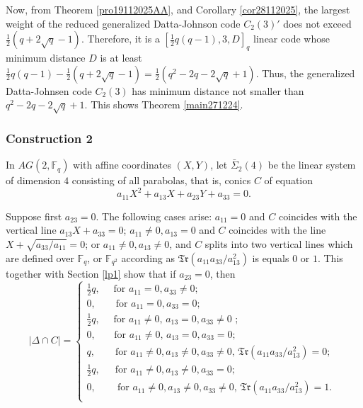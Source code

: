\documentclass[sn-mathphys-num]{sn-jnl}%
\begin{document}
Now, from Theorem \ref{pro19112025AA}, and Corollary  \ref{cor28112025}, the largest weight of the reduced generalized Datta-Johnson code $C_2(3)'$  does not exceed
$\frac{1}{2}(q+2\sqrt{q}-1)$. Therefore, it is a $\left[\frac{1}{2} q(q-1),3,D\right]_q$ linear code whose minimum distance $D$ is at least $\frac{1}{2} q(q-1)-\frac{1}{2}(q+2\sqrt{q}-1)=\frac{1}{2}\left(q^2-2q-2\sqrt{q}+1\right)$. Thus, the generalized Datta-Johnsen code $C_2(3)$ has minimum distance not smaller than $q^2-2q-2\sqrt{q}+1$. This shows Theorem \ref{main271224}.

\subsubsection{Construction 2}
In $AG(2,\mathbb{F}_q)$ with affine coordinates $(X,Y)$, let $\bar{\Sigma}_2(4)$ be the linear system of dimension $4$ consisting of all parabolas, that is, conics $C$ of equation
\begin{equation*}
   a_{11}X^2+a_{13}X+a_{23}Y+a_{33}=0.
\end{equation*}

Suppose first $a_{23}=0$. The following cases arise: $a_{11}=0$ and $C$ coincides with the vertical line $a_{13}X+a_{33}=0$;  $a_{11}\ne 0,a_{13}=0$ and $C$ coincides with the line $X+\sqrt{a_{33}/a_{11}}=0$;  or $a_{11}\ne 0,a_{13}\ne 0$, and $C$ splits into two vertical lines which are defined over $\mathbb{F}_q$, or $\mathbb{F}_{q^2}$ according as $\mathfrak{Tr}(a_{11}a_{33}/a_{13}^2)$ is equals $0$ or $1$. This together with Section \ref{lp1} show that if $a_{23}= 0$, then
$$ |\Delta\cap C|=
\begin{cases}
\textstyle{\frac{1}{2}}q,\,\,\quad {\mbox{for $a_{11}=0,a_{33}\ne 0$}};\\
0,\,\,\quad\,\,\,\, {\mbox{for $a_{11}=0,a_{33}=0$}};\\
\textstyle{\frac{1}{2}}q,\,\quad\, {\mbox{for $a_{11}\ne 0$, $a_{13}=0,a_{33}\ne 0$ ; }} \\
0,\,\,\quad\,\,\, {\mbox{for $a_{11}\ne 0$, $a_{13}=0,a_{33}=0$; }} \\
q,\,\,\quad\,\,\,\,{\mbox{for $a_{11}\ne 0, a_{13}\ne 0, a_{33}\ne 0$,  $\mathfrak{Tr}(a_{11}a_{33}/a_{13}^2)=0$; }} \\
\textstyle{\frac{1}{2}}q,\,\,\quad\,{\mbox{for $a_{11}\ne 0, a_{13}\ne 0, a_{33}=0$; }} \\
0,\,\,\quad\,\,\,\,\,{\mbox{for $a_{11}\ne 0, a_{13}\ne 0, a_{33}\ne0$,  $\mathfrak{Tr}(a_{11}a_{33}/a_{13}^2)=1$. }} \\
\end{cases}
$$
\end{document}
